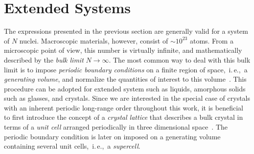 \section{Extended Systems}
The expressions presented in the previous section are generally valid for a system of $N$ nuclei. Macroscopic materials, however, consist of $\sim 10^{23}$ atoms. From a microscopic point of view, this number is virtually infinite, and mathematically described by the \emph{bulk limit} $N \to \infty$. The most common way to deal with this bulk limit is to impose \emph{periodic boundary conditions} on a finite region of space,~i.\,e.,~a \emph{generating volume}, and normalize the quantities of interest to this volume~\cite{BornHuang}. This procedure can be adopted for extended system such as liquids, amorphous solids such as glasses, and crystals. Since we are interested in the special case of crystals with an inherent periodic long-range order throughout this work, it is beneficial to first introduce the concept of a \emph{crystal lattice} that describes a bulk crystal in terms of a \emph{unit cell} arranged periodically in three dimensional space~\cite{Sands1969}. The periodic boundary condition is later on imposed on a generating volume containing several unit cells,~i.\,e.,~a \emph{supercell}.

